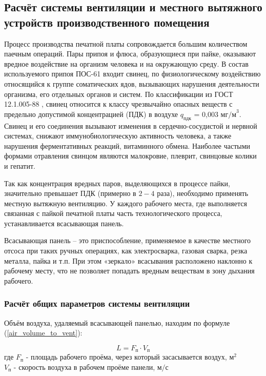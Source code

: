 \newpage

\subsection{Расчёт системы вентиляции и местного вытяжного устройств производственного помещения} \label{vent_system_calculation}

Процесс производства печатной платы сопровождается большим количеством паечным
операций.
Пары припоя и флюса, образующиеся при пайке, оказывают вредное воздействие на
организм человека и на окружающую среду. В состав используемого припоя ПОС-61
входит свинец, по физиологическому воздействию относящийся к группе соматических
ядов, вызывающих нарушения деятельности организма, его отдельных органов и систем.
По классификации из ГОСТ 12.1.005-88 \cite{ecology_gost_005_88}, свинец относится
к классу чрезвычайно опасных веществ с предельно допустимой концентрацией (ПДК)
в воздухе $q_\text{пдк}$ = 0,003 $\text{мг/м}^3$.
Свинец и его соединения вызывают изменения в сердечно-сосудистой и нервной системах,
снижают иммунобиологическую активность человека, а также нарушения ферментативных
реакций, витаминного обмена. Наиболее частыми формами отравления свинцом являются
малокровие, плеврит, свинцовые колики и гепатит.

Так как концентрация вредных паров, выделяющихся в процессе пайки, значительно
превышает ПДК (примерно в $2 - 4$ раза), необходимо применять местную вытяжную вентиляцию.
У каждого рабочего места, где выполняется связанная с пайкой печатной платы часть
технологического процесса, устанавливается всасывающая панель.

Всасывающая панель – это приспособление, применяемое в качестве местного отсоса
при таких ручных операциях, как электросварка, газовая сварка, резка металла,
пайка и т.п. При этом «зеркало» всасывания расположено наклонно к рабочему месту,
что не позволяет попадать вредным веществам в зону дыхания рабочего.

\subsubsection{Расчёт общих параметров системы вентиляции}

Объём воздуха, удаляемый всасывающей панелью, находим по формуле
(\ref{air_volume_to_vent}):

\begin{equation}
\label{air_volume_to_vent}
    L = F_\text{п} \cdot V_\text{п}
\end{equation}
где $F_\text{п}$ - площадь рабочего проёма, через который засасывается воздух, $\text{м}^2$ \\
$V_\text{п}$ - скорость воздуха в рабочем проёме панели, $\text{м/с}$

